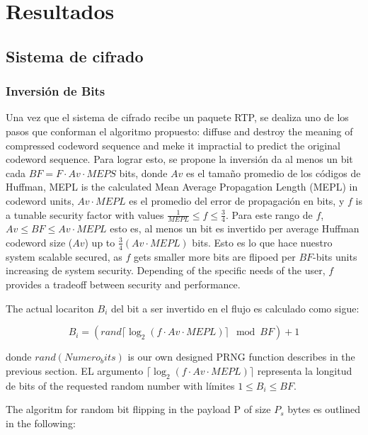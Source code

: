 \chapter{Resultados}




\section{Sistema de cifrado}

\subsection{Inversión de Bits}


Una vez que el sistema de cifrado recibe un paquete RTP, se dealiza uno  de los pasos que conforman el algoritmo propuesto:  diffuse and destroy the meaning of compressed codeword sequence and meke it impractial to predict the original codeword sequence. Para lograr esto, se propone la inversión da al menos un bit cada  $BF = F \cdot Av \cdot MEPS$ bits, donde $Av$ es el tamaño promedio de los códigos de Huffman, MEPL is the calculated Mean Average Propagation Length (MEPL) in codeword units, $Av \cdot MEPL$ es el promedio del error de propagación en bits, y $f$ is a tunable security factor with values $ \frac{1}{MEPL}  \leq f \leq \frac{3}{4}$. Para este rango de $f$, $Av \leq BF \leq Av \cdot MEPL$ esto es, al menos un bit es invertido per average Huffman codeword size ($Av$) up to $\frac{3}{4}(Av \cdot MEPL)$ bits. Esto es lo que hace nuestro system scalable secured, as $f$ gets smaller more bits are flipoed per  $BF$-bits units increasing de system security. Depending of the specific needs of the user, $f$ provides a tradeoff between security and performance.

The actual locariton $B_{i}$ del bit a ser invertido en el flujo es calculado como sigue:

\begin{equation}
B_{i}= \left( rand   \lceil \log_{2}(f \cdot Av \cdot MEPL)  \rceil \mod{BF}      \right) +1
\end{equation}

donde $rand(Numero_bits)$ is our own designed PRNG function describes in the previous section. EL argumento $ \lceil \log_{2}(f \cdot Av \cdot MEPL)  \rceil$ representa la longitud de bits of the requested random number with límites $1 \leq B_{i} \leq BF$.

The algoritm for random bit flipping in the payload P of size $P_{s}$ bytes es outlined in the following:

